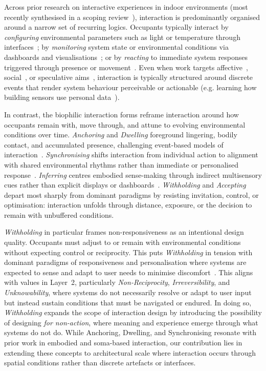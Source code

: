 Across prior research on interactive experiences in indoor environments (most recently synthesised in a scoping review~\cite{rao2025smart}), interaction is predominantly organised around a narrow set of recurring logics. Occupants typically interact by \emph{configuring} environmental parameters such as light or temperature through interfaces~\cite{alavi2017comfort,kudryashova2020interactive,clear2013understanding}; by \emph{monitoring} system state or environmental conditions via dashboards and visualisations~\cite{margariti2024evaluating}; or by \emph{reacting} to immediate system responses triggered through presence or movement~\cite{vallgaarda2014dress}. Even when work targets affective~\cite{gaver2006history}, social~\cite{petersen2007squeeze}, or speculative aims~\cite{gough2021speculating}, interaction is typically structured around discrete events that render system behaviour perceivable or actionable (e.g. learning how building sensors use personal data~\cite{schnadelbach2019adaptive}).

In contrast, the biophilic interaction forms reframe interaction around how occupants remain with, move through, and attune to evolving environmental conditions over time. \emph{Anchoring} and \emph{Dwelling} foreground lingering, bodily contact, and accumulated presence, challenging event-based models of interaction~\cite{hansen2009pendaphonics}. \emph{Synchronising} shifts interaction from individual action to alignment with shared environmental rhythms rather than immediate or personalised response~\cite{yu2018delight}. \emph{Inferring} centres embodied sense-making through indirect multisensory cues rather than explicit displays or dashboards~\cite{marques2020real}. \emph{Withholding} and \emph{Accepting} depart most sharply from dominant paradigms by resisting invitation, control, or optimisation: interaction unfolds through distance, exposure, or the decision to remain with unbuffered conditions.

\emph{Withholding} in particular frames non-responsiveness as an intentional design quality. Occupants must adjust to or remain with environmental conditions without expecting control or reciprocity. This puts \emph{Withholding} in tension with dominant paradigms of responsiveness and personalisation where systems are expected to sense and adapt to user needs to minimise discomfort~\cite{alavi2017comfort}.  This aligns with values in Layer~2, particularly \emph{Non-Reciprocity}, \emph{Irreversibility}, and \emph{Unknowability}, where systems do not necessarily resolve or adapt to user input but instead sustain conditions that must be navigated or endured. In doing so, \emph{Withholding} expands the scope of interaction design by introducing the possibility of designing \emph{for non-action}, where meaning and experience emerge through what systems do not do. While Anchoring, Dwelling, and Synchronising resonate with prior work in embodied and soma-based interaction, our contribution lies in extending these concepts to architectural scale where interaction occurs through spatial conditions rather than discrete artefacts or interfaces.

